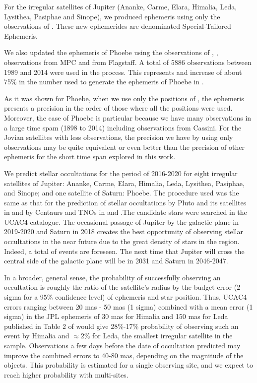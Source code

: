 \documentclass[useAMS,usenatbib]{mn2e}
\begin{document}
For the irregular satellites of Jupiter (Ananke, Carme, Elara, Himalia, Leda, Lysithea, Pasiphae and Sinope), we produced ephemeris using only the observations of . These new ephemerides are denominated Special-Tailored Ephemeris.

We also updated the ephemeris of Phoebe \citep{Desmars2013} using the observations of , \cite{Peng2015}, observations from  MPC and from Flagstaff. A total of 5886 observations between 1989 and 2014 were used in the process. This represents and increase of about 75\% in the number used to generate the ephemeris of Phoebe in \cite{Desmars2013}.

As it was shown for Phoebe, when we use only the positions of , the ephemeris presents a precision in the order of those where all the positions were used. Moreover, the case of Phoebe is particular because we have many observations in a large time spam (1898 to 2014) including observations from Cassini. For the Jovian satellites with less observations, the precision we have by using only  observations may be quite equivalent or even better than the precision of other ephemeris for the short time span explored in this work.

We predict stellar occultations for the period of 2016-2020 for eight irregular satellites of Jupiter: Ananke, Carme, Elara, Himalia, Leda, Lysithea, Pasiphae, and Sinope; and one satellite of Saturn: Phoebe. The procedure used was the same as that for the prediction of stellar occultations by Pluto and its satellites in \cite{Assafin2010} and by Centaurs and TNOs in \cite{Assafin2012} and \cite{Camargo2014}.The candidate stars were searched in the UCAC4 catalogue. The occasional passage of Jupiter by the galactic plane in 2019-2020 and Saturn in 2018 creates the best opportunity of observing stellar occultations in the near future due to the great density of stars in the region. Indeed, a total of \noccs events are foreseen. The next time that Jupiter will cross the central side of the galactic plane will be in 2031 and Saturn in 2046-2047.

In a broader, general sense, the probability of successfully observing an occultation is roughly the ratio of the satellite's radius by the budget error (2 sigma for a 95\% confidence level) of ephemeris and star position. Thus, UCAC4 errors ranging between 20 mas - 50 mas (1 sigma) combined with a mean error (1 sigma) in the JPL ephemeris of 30 mas for Himalia and 150 mas for Leda published in Table 2 of \cite{Jacobson2012} would give 28\%-17\% probability of observing such an event by Himalia and $\approx2$\% for Leda, the smallest irregular satellite in the sample. Observations a few days before the date of occultation predicted may improve the combined errors to 40-80 mas, depending on the magnitude of the objects. This probability is estimated for a single observing site, and we expect to reach higher probability with multi-sites.
\end{document}
